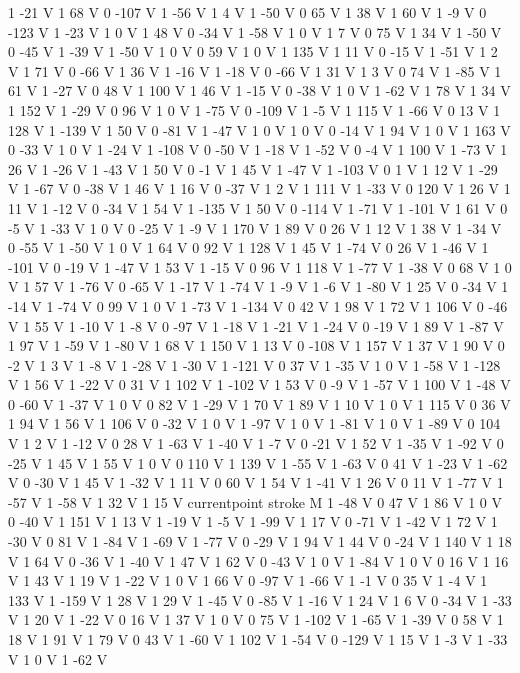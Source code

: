 {{1 -21 V
1 68 V
0 -107 V
1 -56 V
1 4 V
1 -50 V
0 65 V
1 38 V
1 60 V
1 -9 V
0 -123 V
1 -23 V
1 0 V
1 48 V
0 -34 V
1 -58 V
1 0 V
1 7 V
0 75 V
1 34 V
1 -50 V
0 -45 V
1 -39 V
1 -50 V
1 0 V
0 59 V
1 0 V
1 135 V
1 11 V
0 -15 V
1 -51 V
1 2 V
1 71 V
0 -66 V
1 36 V
1 -16 V
1 -18 V
0 -66 V
1 31 V
1 3 V
0 74 V
1 -85 V
1 61 V
1 -27 V
0 48 V
1 100 V
1 46 V
1 -15 V
0 -38 V
1 0 V
1 -62 V
1 78 V
1 34 V
1 152 V
1 -29 V
0 96 V
1 0 V
1 -75 V
0 -109 V
1 -5 V
1 115 V
1 -66 V
0 13 V
1 128 V
1 -139 V
1 50 V
0 -81 V
1 -47 V
1 0 V
1 0 V
0 -14 V
1 94 V
1 0 V
1 163 V
0 -33 V
1 0 V
1 -24 V
1 -108 V
0 -50 V
1 -18 V
1 -52 V
0 -4 V
1 100 V
1 -73 V
1 26 V
1 -26 V
1 -43 V
1 50 V
0 -1 V
1 45 V
1 -47 V
1 -103 V
0 1 V
1 12 V
1 -29 V
1 -67 V
0 -38 V
1 46 V
1 16 V
0 -37 V
1 2 V
1 111 V
1 -33 V
0 120 V
1 26 V
1 11 V
1 -12 V
0 -34 V
1 54 V
1 -135 V
1 50 V
0 -114 V
1 -71 V
1 -101 V
1 61 V
0 -5 V
1 -33 V
1 0 V
0 -25 V
1 -9 V
1 170 V
1 89 V
0 26 V
1 12 V
1 38 V
1 -34 V
0 -55 V
1 -50 V
1 0 V
1 64 V
0 92 V
1 128 V
1 45 V
1 -74 V
0 26 V
1 -46 V
1 -101 V
0 -19 V
1 -47 V
1 53 V
1 -15 V
0 96 V
1 118 V
1 -77 V
1 -38 V
0 68 V
1 0 V
1 57 V
1 -76 V
0 -65 V
1 -17 V
1 -74 V
1 -9 V
1 -6 V
1 -80 V
1 25 V
0 -34 V
1 -14 V
1 -74 V
0 99 V
1 0 V
1 -73 V
1 -134 V
0 42 V
1 98 V
1 72 V
1 106 V
0 -46 V
1 55 V
1 -10 V
1 -8 V
0 -97 V
1 -18 V
1 -21 V
1 -24 V
0 -19 V
1 89 V
1 -87 V
1 97 V
1 -59 V
1 -80 V
1 68 V
1 150 V
1 13 V
0 -108 V
1 157 V
1 37 V
1 90 V
0 -2 V
1 3 V
1 -8 V
1 -28 V
1 -30 V
1 -121 V
0 37 V
1 -35 V
1 0 V
1 -58 V
1 -128 V
1 56 V
1 -22 V
0 31 V
1 102 V
1 -102 V
1 53 V
0 -9 V
1 -57 V
1 100 V
1 -48 V
0 -60 V
1 -37 V
1 0 V
0 82 V
1 -29 V
1 70 V
1 89 V
1 10 V
1 0 V
1 115 V
0 36 V
1 94 V
1 56 V
1 106 V
0 -32 V
1 0 V
1 -97 V
1 0 V
1 -81 V
1 0 V
1 -89 V
0 104 V
1 2 V
1 -12 V
0 28 V
1 -63 V
1 -40 V
1 -7 V
0 -21 V
1 52 V
1 -35 V
1 -92 V
0 -25 V
1 45 V
1 55 V
1 0 V
0 110 V
1 139 V
1 -55 V
1 -63 V
0 41 V
1 -23 V
1 -62 V
0 -30 V
1 45 V
1 -32 V
1 11 V
0 60 V
1 54 V
1 -41 V
1 26 V
0 11 V
1 -77 V
1 -57 V
1 -58 V
1 32 V
1 15 V
currentpoint stroke M
1 -48 V
0 47 V
1 86 V
1 0 V
0 -40 V
1 151 V
1 13 V
1 -19 V
1 -5 V
1 -99 V
1 17 V
0 -71 V
1 -42 V
1 72 V
1 -30 V
0 81 V
1 -84 V
1 -69 V
1 -77 V
0 -29 V
1 94 V
1 44 V
0 -24 V
1 140 V
1 18 V
1 64 V
0 -36 V
1 -40 V
1 47 V
1 62 V
0 -43 V
1 0 V
1 -84 V
1 0 V
0 16 V
1 16 V
1 43 V
1 19 V
1 -22 V
1 0 V
1 66 V
0 -97 V
1 -66 V
1 -1 V
0 35 V
1 -4 V
1 133 V
1 -159 V
1 28 V
1 29 V
1 -45 V
0 -85 V
1 -16 V
1 24 V
1 6 V
0 -34 V
1 -33 V
1 20 V
1 -22 V
0 16 V
1 37 V
1 0 V
0 75 V
1 -102 V
1 -65 V
1 -39 V
0 58 V
1 18 V
1 91 V
1 79 V
0 43 V
1 -60 V
1 102 V
1 -54 V
0 -129 V
1 15 V
1 -3 V
1 -33 V
1 0 V
1 -62 V
}}
